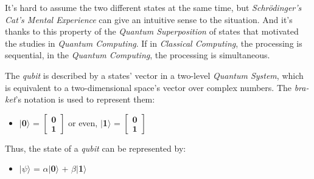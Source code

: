 \documentclass[conference]{IEEEtran}
\begin{document}
\vspace{4pt}

It's hard to assume the two different states at the same time, but \textit{Schr\"odinger's Cat's Mental Experience} can give an intuitive sense to the situation. And it's thanks to this property of the \textit{Quantum Superposition} of states that motivated the studies in \textit{Quantum Computing}. If in \textit{Classical Computing}, the processing is sequential, in the \textit{Quantum Computing}, the processing is simultaneous.

\vspace{4pt}

The \textit{qubit} is described by a states' vector in a two-level \textit{Quantum System}, which is equivalent to a two-dimensional space's vector over complex numbers. The \textit{bra-ket}'s notation is used to represent them:

\vspace{4pt}

\begin{itemize}
    \item 
    \begin{center}
        $\mid$\textbf{0}$\rangle$ = ${
            \begin{bmatrix}
                \textbf{0}\\
                \textbf{1}
            \end{bmatrix}}$ 
        or even, 
        $\mid$\textbf{1}$\rangle$ = ${
            \begin{bmatrix}
                \textbf{0}\\
                \textbf{1}
            \end{bmatrix}}$ 
    \end{center}
\end{itemize}

\vspace{4pt}

Thus, the state of a \textit{qubit} can be represented by:

\vspace{4pt}

\begin{itemize}
    \item 
    \begin{center}
        $\mid$$\psi$$\rangle$ = $\alpha$$\mid$\textbf{0}$\rangle$ + $\beta$$\mid$\textbf{1}$\rangle$
    \end{center}
\end{itemize}
\end{document}
